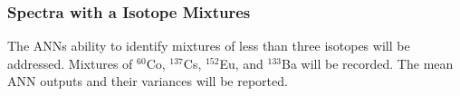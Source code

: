 \subsubsection{Spectra with a Isotope Mixtures}


The ANNs ability to identify mixtures of less than three isotopes will be addressed. Mixtures of $^{60}$Co, $^{137}$Cs, $^{152}$Eu, and $^{133}$Ba will be recorded. The mean ANN outputs and their variances will be reported.